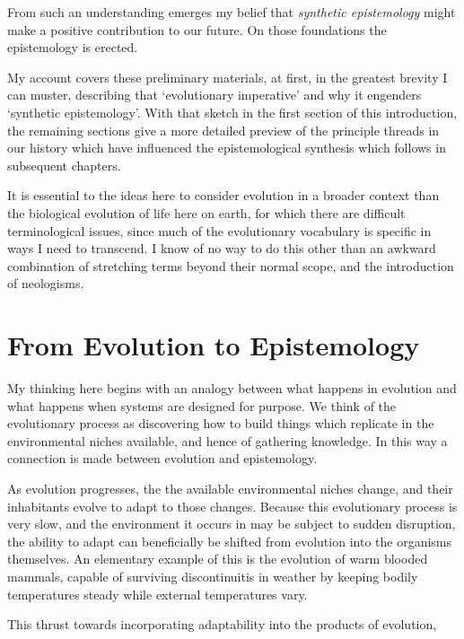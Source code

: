 From such an understanding emerges my belief that \emph{synthetic epistemology} might make a positive contribution to our future.
On those foundations the epistemology is erected.

My account covers these preliminary materials, at first, in the greatest brevity I can muster, describing that `evolutionary imperative' and why it engenders `synthetic epistemology'.
With that sketch in the first section of this introduction, the remaining sections give a more detailed preview of the principle threads in our history which have influenced the epistemological synthesis which follows in subsequent chapters.

It is essential to the ideas here to consider evolution in a broader context than the biological evolution of life here on earth, for which there are difficult terminological issues, since much of the evolutionary vocabulary is specific in ways I need to transcend.
I know of no way to do this other than an awkward combination of stretching terms beyond their normal scope, and the introduction of neologisms.

\section{From Evolution to Epistemology}

My thinking here begins with an analogy between what happens in evolution and what happens when systems are designed for purpose.
We think of the evolutionary process as discovering how to build things which replicate in the environmental niches available, and hence of gathering knowledge.
In this way a connection is made between evolution and epistemology.

As evolution progresses, the the available environmental niches change, and their inhabitants evolve to adapt to those changes.
Because this evolutionary process is very slow, and the environment it occurs in may be subject to sudden disruption, the ability to adapt can beneficially be shifted from evolution into the organisms themselves.
An elementary example of this is the evolution of warm blooded mammals, capable of surviving discontinuitis in weather by keeping bodily temperatures steady while external temperatures vary.

This thrust towards incorporating adaptability into the products of evolution,

